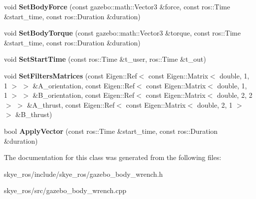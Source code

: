 \begin{DoxyCompactItemize}
\item 
\hypertarget{classgazebo_1_1_gazebo_body_wrench_a22da3c17fbf8cf202bcb62a77c3707d6}{void {\bfseries Set\-Body\-Force} (const gazebo\-::math\-::\-Vector3 \&force, const ros\-::\-Time \&start\-\_\-time, const ros\-::\-Duration \&duration)}\label{classgazebo_1_1_gazebo_body_wrench_a22da3c17fbf8cf202bcb62a77c3707d6}

\item 
\hypertarget{classgazebo_1_1_gazebo_body_wrench_ab672b6b39276477b3bb61586cfa321dd}{void {\bfseries Set\-Body\-Torque} (const gazebo\-::math\-::\-Vector3 \&torque, const ros\-::\-Time \&start\-\_\-time, const ros\-::\-Duration \&duration)}\label{classgazebo_1_1_gazebo_body_wrench_ab672b6b39276477b3bb61586cfa321dd}

\item 
\hypertarget{classgazebo_1_1_gazebo_body_wrench_a51b0f72347b899b9c973abae1f6a4fc1}{void {\bfseries Set\-Start\-Time} (const ros\-::\-Time \&t\-\_\-user, ros\-::\-Time \&t\-\_\-out)}\label{classgazebo_1_1_gazebo_body_wrench_a51b0f72347b899b9c973abae1f6a4fc1}

\item 
\hypertarget{classgazebo_1_1_gazebo_body_wrench_a7b81e76da9e7d3f5653f3c0b21504424}{void {\bfseries Set\-Filters\-Matrices} (const Eigen\-::\-Ref$<$ const Eigen\-::\-Matrix$<$ double, 1, 1 $>$ $>$ \&A\-\_\-orientation, const Eigen\-::\-Ref$<$ const Eigen\-::\-Matrix$<$ double, 1, 1 $>$ $>$ \&B\-\_\-orientation, const Eigen\-::\-Ref$<$ const Eigen\-::\-Matrix$<$ double, 2, 2 $>$ $>$ \&A\-\_\-thrust, const Eigen\-::\-Ref$<$ const Eigen\-::\-Matrix$<$ double, 2, 1 $>$ $>$ \&B\-\_\-thrust)}\label{classgazebo_1_1_gazebo_body_wrench_a7b81e76da9e7d3f5653f3c0b21504424}

\item 
\hypertarget{classgazebo_1_1_gazebo_body_wrench_af08623ecc1f490f71b46ce508b4f0808}{bool {\bfseries Apply\-Vector} (const ros\-::\-Time \&start\-\_\-time, const ros\-::\-Duration \&duration)}\label{classgazebo_1_1_gazebo_body_wrench_af08623ecc1f490f71b46ce508b4f0808}

\end{DoxyCompactItemize}


The documentation for this class was generated from the following files\-:\begin{DoxyCompactItemize}
\item 
skye\-\_\-ros/include/skye\-\_\-ros/gazebo\-\_\-body\-\_\-wrench.\-h\item 
skye\-\_\-ros/src/gazebo\-\_\-body\-\_\-wrench.\-cpp\end{DoxyCompactItemize}

